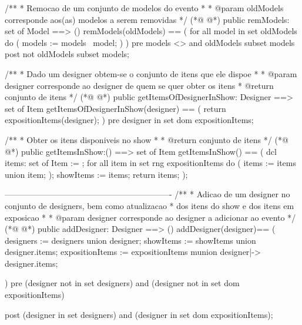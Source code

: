 \begin{vdmpp}[breaklines=true]
 /**
 * Remocao de um conjunto de modelos do evento
 * 
 * @param oldModels corresponde aos(as) modelos a serem removidas
 */
(*@
\label{remModels:102}
@*)
 public remModels: set of Model ==> ()
  remModels(oldModels) == (
    for all model in set oldModels do (
      models := models \ {model};
    )
  )
 pre models <> {} and oldModels subset models
 post not oldModels subset models;
 
 /**
 * Dado um designer obtem-se o conjunto de itens que ele dispoe
 * 
 * @param designer corresponde ao designer de quem se quer obter os itens
 * @return conjunto de itens
 */
(*@
\label{getItemsOfDesignerInShow:117}
@*)
 public getItemsOfDesignerInShow: Designer ==> set of Item
 getItemsOfDesignerInShow(designer) ==
 (
  return expositionItems(designer);
 )
 pre designer in set dom expositionItems;
 
 /**
 * Obter os itens disponiveis no show
 * 
 * @return conjunto de itens
 */
(*@
\label{getItemsInShow:129}
@*)
 public getItemsInShow:() ==> set of Item
 getItemsInShow() ==
 (
  dcl items: set of Item := {};
  for all item in set rng expositionItems do (
   items := items union item;
  );
  showItems := items;
  return items;
 );

-------------------------------------------------------------
 /**
 * Adicao de um designer no conjunto de designers, bem como atualizacao 
 * dos itens do show e dos itens em exposicao
 * 
 * @param designer corresponde ao designer a adicionar ao evento
 */
(*@
\label{addDesigner:147}
@*)
 public addDesigner: Designer ==> ()
 addDesigner(designer)==
 (
  designers := designers union {designer};
  showItems := showItems union designer.items;
  expositionItems := expositionItems munion {designer|-> designer.items};
  
 )
 pre (designer not in set designers) and
   (designer not in set dom expositionItems)
 
 post (designer  in set designers) and
    (designer  in set dom expositionItems); 
 

\end{vdmpp}
